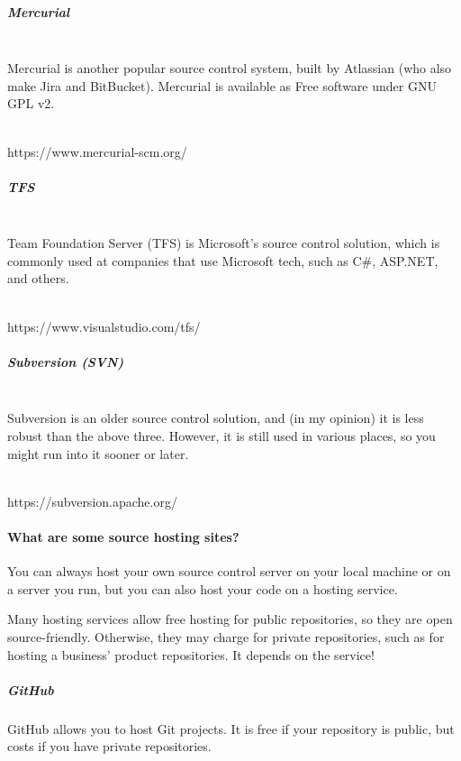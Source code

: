 \documentclass[a4paper,12pt,oneside]{book}
\begin{document}
        \subparagraph{Mercurial} ~\\

            Mercurial is another popular source control system, built
            by Atlassian (who also make Jira and BitBucket).
            Mercurial is available as Free software under GNU GPL v2.

            ~\\
            https://www.mercurial-scm.org/

        \subparagraph{TFS} ~\\

            Team Foundation Server (TFS) is Microsoft's source control
            solution, which is commonly used at companies that use
            Microsoft tech, such as C\#, ASP.NET, and others.

            ~\\
            https://www.visualstudio.com/tfs/

        \subparagraph{Subversion (SVN)} ~\\

            Subversion is an older source control solution, and (in my opinion)
            it is less robust than the above three. However, it is still
            used in various places, so you might run into it sooner or later.
            
            ~\\
            https://subversion.apache.org/

    \hrulefill

    \paragraph{What are some source hosting sites?}

        You can always host your own source control server on your local
        machine or on a server you run, but you can also host your code
        on a hosting service.

        Many hosting services allow free hosting for public repositories,
        so they are open source-friendly. Otherwise, they may charge
        for private repositories, such as for hosting a business' product
        repositories. It depends on the service!

        \subparagraph{GitHub}

            GitHub allows you to host Git projects. It is free if your
            repository is public, but costs if you have private repositories.
\end{document}
